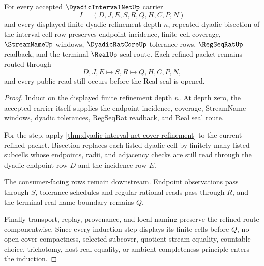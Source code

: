 \begin{theorem}
\label{thm:dyadic-interval-net-mesh-refinement-induction}
For every accepted $\DyadicIntervalNetUp$ carrier
$$
I=(D,J,E,S,R,Q,H,C,P,N)
$$
and every displayed finite dyadic refinement depth $n$, repeated dyadic bisection of the interval-cell row preserves endpoint incidence, finite-cell coverage, $\StreamNameUp$ windows, $\DyadicRatCoreUp$ tolerance rows, $\RegSeqRatUp$ readback, and the terminal $\RealUp$ seal route. Each refined packet remains routed through
$$
D,J,E \longmapsto S,R \longmapsto Q,H,C,P,N,
$$
and every public read still occurs before the Real seal is opened.
\end{theorem}
\begin{proof}
Induct on the displayed finite refinement depth $n$. At depth zero, the accepted carrier itself supplies the endpoint incidence, coverage, StreamName windows, dyadic tolerances, RegSeqRat readback, and Real seal route.

For the step, apply \autoref{thm:dyadic-interval-net-cover-refinement} to the current refined packet. Bisection replaces each listed dyadic cell by finitely many listed subcells whose endpoints, radii, and adjacency checks are still read through the dyadic endpoint row $D$ and the incidence row $E$.

The consumer-facing rows remain downstream. Endpoint observations pass through $S$, tolerance schedules and regular rational reads pass through $R$, and the terminal real-name boundary remains $Q$.

Finally transport, replay, provenance, and local naming preserve the refined route componentwise. Since every induction step displays its finite cells before $Q$, no open-cover compactness, selected subcover, quotient stream equality, countable choice, trichotomy, host real equality, or ambient completeness principle enters the induction.
\end{proof}

